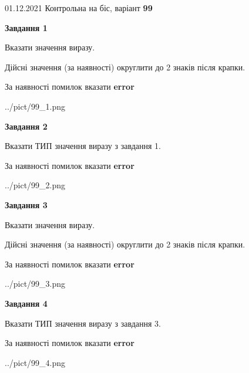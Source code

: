 \documentclass[11pt, ukrainian]{article}
\begin{document}
{01.12.2021 Контрольна на біс, варіант  \No \textbf { 99 }\par}
{
\begin {large}
{\begin {center}\textbf{Завдання 1}\end {center}}\par
Вказати значення виразу. \par
Дійсні значення (за наявності) округлити до 2 знаків після крапки. \par
За наявності помилок вказати \textbf{error}

\begin{center}
	{../pict/99_1.png}
\end{center}
\newpage

{\begin {center}\textbf{Завдання 2}\end {center}}\par
Вказати ТИП значення виразу з завдання 1. \par
За наявності помилок вказати \textbf{error}

\begin{center}
	{../pict/99_2.png}
\end{center}
\newpage

{\begin {center}\textbf{Завдання 3}\end {center}}\par
Вказати значення виразу. \par
Дійсні значення (за наявності) округлити до 2 знаків після крапки. \par
За наявності помилок вказати \textbf{error}

\begin{center}
	{../pict/99_3.png}
\end{center}
\newpage

{\begin {center}\textbf{Завдання 4}\end {center}}\par
Вказати ТИП значення виразу з завдання 3. \par
За наявності помилок вказати \textbf{error}

\begin{center}
	{../pict/99_4.png}
\end{center}
\newpage


\end{large}}
\end{document}
